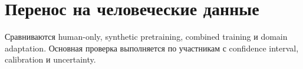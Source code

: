 \chapter{Перенос на человеческие данные}

Сравниваются human-only, synthetic pretraining, combined training и domain adaptation.
Основная проверка выполняется по участникам с confidence interval, calibration и uncertainty.

